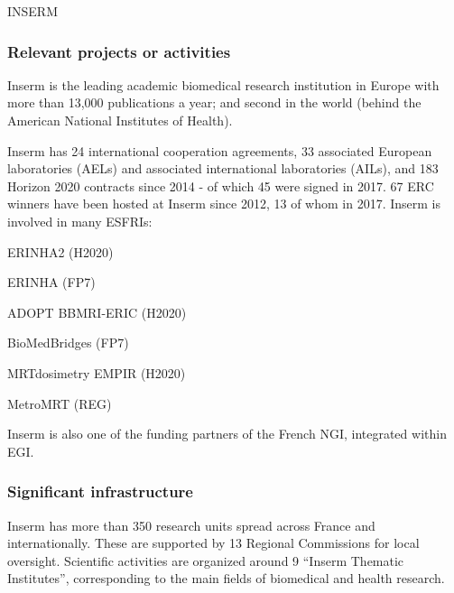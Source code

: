 \begin{sitedescription}{INSERM}
\subsubsection*{Relevant projects or activities}
Inserm is the leading academic biomedical research institution in Europe with
more than 13,000 publications a year; and second in the world (behind the
American National Institutes of Health).

Inserm has 24 international cooperation agreements, 33 associated European
laboratories (AELs) and associated international laboratories (AILs), and 183
Horizon 2020 contracts since 2014 - of which 45 were signed in 2017. 67 ERC
winners have been hosted at Inserm since 2012, 13 of whom in 2017.  Inserm is
involved in many ESFRIs:
\begin{compactenum}
\item ERINHA2 (H2020)
\item ERINHA (FP7)
\item ADOPT BBMRI-ERIC (H2020)
\item BioMedBridges (FP7)
\item MRTdosimetry EMPIR (H2020)
\item MetroMRT (REG)
\end{compactenum}
Inserm is also one of the funding partners of the French NGI, integrated within
EGI.

\subsubsection*{Significant infrastructure}
Inserm has more than 350 research units spread across France and
internationally. These are supported by 13 Regional Commissions for local
oversight. Scientific activities are organized around 9 “Inserm Thematic
Institutes”, corresponding to the main fields of biomedical and health
research.

\end{sitedescription}
